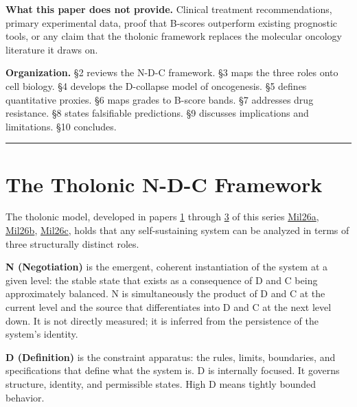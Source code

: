 \documentclass[12pt]{article}
\begin{document}
\textbf{What this paper does not provide.} Clinical treatment
recommendations, primary experimental data, proof that B-scores
outperform existing prognostic tools, or any claim that the tholonic
framework replaces the molecular oncology literature it draws on.

\textbf{Organization.} §2 reviews the N-D-C framework. §3 maps the three
roles onto cell biology. §4 develops the D-collapse model of
oncogenesis. §5 defines quantitative proxies. §6 maps grades to B-score
bands. §7 addresses drug resistance. §8 states falsifiable predictions.
§9 discusses implications and limitations. §10 concludes.

\begin{center}\rule{0.5\linewidth}{0.5pt}\end{center}

\section{The Tholonic N-D-C Framework}\label{the-tholonic-n-d-c-framework}

The tholonic model, developed in papers
\href{https://github.com/baardev/truevalue/blob/main/docnav/Research/papers/1_recursive-tholonic-five-constants/1_recursive-tholonic-five-constants.pdf}{1}
through
\href{https://github.com/baardev/truevalue/blob/main/docnav/Research/papers/3_minimal-recursive-triadic-framework/3_minimal-recursive-triadic-framework.pdf}{3}
of this series
\href{https://github.com/baardev/truevalue/blob/main/docnav/Research/papers/1_recursive-tholonic-five-constants/1_recursive-tholonic-five-constants.pdf}{Mil26a},
\href{https://github.com/baardev/truevalue/blob/main/docnav/Research/papers/2_supply-chain-transparency-tvpci/2_supply-chain-transparency-tvpci.pdf}{Mil26b},
\href{https://github.com/baardev/truevalue/blob/main/docnav/Research/papers/3_minimal-recursive-triadic-framework/3_minimal-recursive-triadic-framework.pdf}{Mil26c},
holds that any self-sustaining system can be analyzed in terms of three
structurally distinct roles.

\textbf{N (Negotiation)} is the emergent, coherent instantiation of the
system at a given level: the stable state that exists as a consequence
of D and C being approximately balanced. N is simultaneously the product
of D and C at the current level and the source that differentiates into
D and C at the next level down. It is not directly measured; it is
inferred from the persistence of the system's identity.

\textbf{D (Definition)} is the constraint apparatus: the rules, limits,
boundaries, and specifications that define what the system is. D is
internally focused. It governs structure, identity, and permissible
states. High D means tightly bounded behavior.
\end{document}
